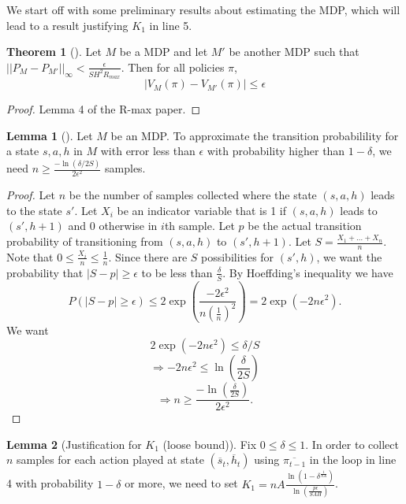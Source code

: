 \documentclass[12pt, letterpaper]{article}
\theoremstyle{definition}
\newtheorem*{thm}{Theorem}
\newtheorem*{lemma}{Lemma}
\theoremstyle{remark}
\begin{document}
We start off with some preliminary results about estimating the MDP, which will lead to a result justifying \(K_1\) in line 5.

\begin{thm}[]
    Let \(M\) be a MDP and let \(M'\) be another MDP such that \(||P_{M} - P_{M'}||_{\infty} < \frac{\epsilon}{SH^2R_{max}}\). Then for all policies \(\pi\),
    \[|V_{M}(\pi) - V_{M'}(\pi)| \leq \epsilon\]
\end{thm}

\begin{proof}[Proof]
    Lemma 4 of the R-max paper.
\end{proof}

\begin{lemma}[]
    Let \(M\) be an MDP. To approximate the transition probabilility for a state \(s, a, h\) in \(M\) with error less than \(\epsilon\) with probability higher than \(1 - \delta\), we need \(n \geq \frac{-\ln(\delta/2S)}{2\epsilon^2}\) samples.
\end{lemma}

\begin{proof}[Proof]
    Let \(n\) be the number of samples collected where the state \((s, a, h)\) leads to the state \(s'\). Let \(X_i\) be an indicator variable that is 1 if \((s, a, h)\) leads to \((s', h+1)\) and 0 otherwise in \(i\)th sample. Let \(p\) be the actual transition probability of transitioning from \((s, a, h)\) to \((s', h+1)\). Let \(S = \frac{X_1 + \ldots + X_{n}}{n}\). Note that \(0 \leq \frac{X_i}{n} \leq \frac{1}{n}\). Since there are \(S\) possibilities for \((s', h)\), we want the probability that \(|S - p| \geq \epsilon\) to be less than \(\frac{\delta}{S}\). By Hoeffding's inequality we have
    \[P(|S - p| \geq \epsilon) \leq 2 \exp (\frac{-2\epsilon^{2}}{n(\frac{1}{n})^2}) = 2 \exp(-2n\epsilon^2).\]
    We want
    \[2 \exp(-2n\epsilon^2) \leq \delta/S\]
    \[\Rightarrow -2n\epsilon^2 \leq \ln(\frac{\delta}{2S})\]
    \[\Rightarrow n \geq \frac{-\ln(\frac{\delta}{2S})}{2\epsilon^2}.\]
\end{proof}


\begin{lemma}[Justification for \(K_1\) (loose bound)]
    Fix \(0 \leq \delta \leq 1\). In order to collect \(n\) samples for each action played at state \((\overline{s}_t, \overline{h}_t)\) using \(\overline{\pi_{t-1}}\) in the loop in line 4 with probability \(1-\delta\) or more, we need to set \(K_1 = nA \frac{\ln(1 - \delta^{\frac{1}{nA}})}{\ln(\frac{p\epsilon}{SAH})}\).
\end{lemma}
\end{document}
